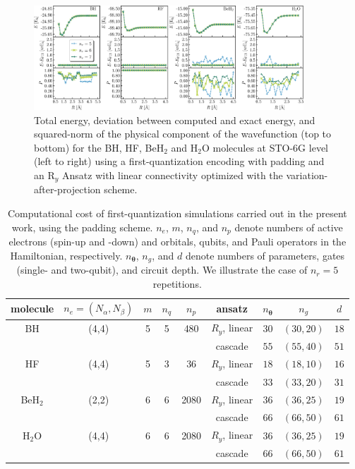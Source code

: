 \documentclass[aps,pra,onecolumn]{revtex4-2}
\newcommand{\bgreek}[1]{{\boldsymbol{#1}}}
\newcommand{\ry}{R_y}
\begin{document}
\begin{figure}[t!]
\includegraphics[width=0.9\textwidth]{../figures/first_quantization_pad_vap_ry_linear/first_quantization_pad_vap_ry_linear.eps}
\caption{Total energy, deviation between computed and exact energy, and squared-norm of the physical component of the wavefunction
(top to bottom) for the BH, HF, BeH$_2$ and H$_2$O molecules at STO-6G level (left to right) 
using a first-quantization encoding with padding and an R$_y$ Ansatz with linear connectivity optimized with the variation-after-projection scheme.
}
\label{figure:first_pad_vap_ry}
\end{figure} 

\begin{table}[h!]
\begin{tabular}{ccccc|cccc}
\hline\hline
molecule & $n_e=(N_\alpha,N_\beta)$ & $m$ & $n_q$ & $n_p$ & ansatz & $n_{\bgreek{\theta}}$ & $n_g$ & $d$ \\ 
\hline
BH & (4,4) & 5 & 5 & 480 & $\ry$, linear & $30$ & $(30, 20)$ & $18$ \\ 
  &   &  &   &   & cascade & $55$ & $(55, 40)$ & $51$ \\ 
\hline
HF & (4,4) & 5 & 3 & 36 & $\ry$, linear & $18$ & $(18, 10)$ & $16$ \\ 
  &   &  &   &   & cascade & $33$ & $(33, 20)$ & $31$ \\ 
\hline
BeH$_2$ & (2,2) & 6 & 6 & 2080 & $\ry$, linear & $36$ & $(36, 25)$ & $19$ \\ 
  &   &  &   &   & cascade & $66$ & $(66, 50)$ & $61$ \\ 
\hline
H$_2$O & (4,4) & 6 & 6 & 2080 & $\ry$, linear & $36$ & $(36, 25)$ & $19$ \\ 
  &   &  &   &   & cascade & $66$ & $(66, 50)$ & $61$ \\ 
\hline\hline
\end{tabular}
\caption{Computational cost of first-quantization simulations carried out in the present work, using the padding scheme.
 $n_e$, $m$, $n_q$, and $n_p$ denote numbers of active electrons (spin-up and -down) and orbitals, qubits, and Pauli operators in the Hamiltonian, respectively.
$n_{\bgreek{\theta}}$, $n_g$, and $d$ denote numbers of parameters, gates (single- and two-qubit), and circuit depth. We illustrate the case of $n_r=5$ repetitions.}
\label{table:computational_cost_first_pad}
\end{table}
\end{document}
